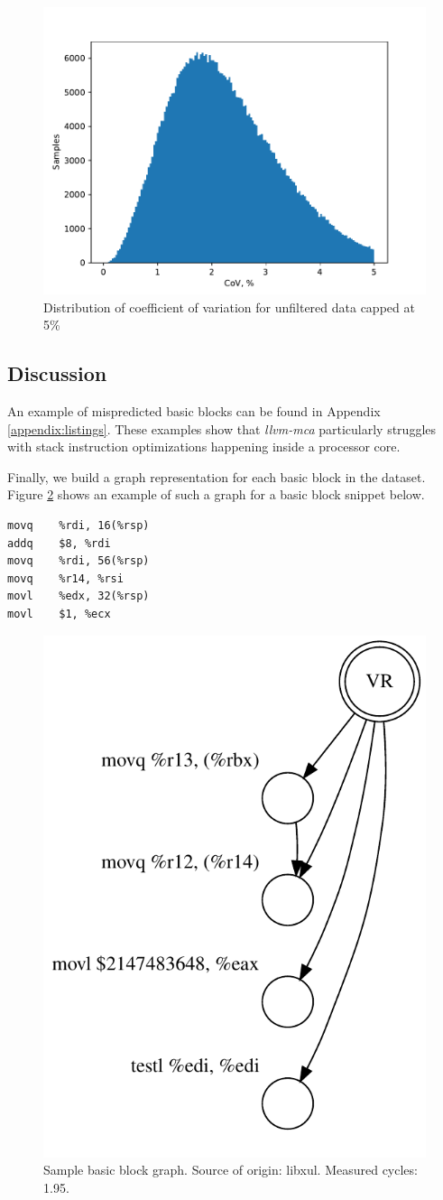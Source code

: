 \begin{figure}[h]
  \caption{Distribution of coefficient of variation for unfiltered data capped at 5\%}
  \centering
  \label{fig:cov}
  \includegraphics[width=0.9\columnwidth]{cov_distribution_zoom}
\end{figure}

\subsection{Discussion}
An example of mispredicted basic blocks can be found in Appendix \ref{appendix:listings}.
These examples show that \textit{llvm-mca} particularly struggles with stack instruction
optimizations happening inside a processor core.

Finally, we build a graph representation for each basic block in the dataset. 
Figure \ref{fig:sample_graph} shows an example of such a graph for a basic block snippet below.

\begin{lstlisting}[title={Source of the sample basic block}]
movq	%rdi, 16(%rsp)
addq	$8, %rdi
movq	%rdi, 56(%rsp)
movq	%r14, %rsi
movl	%edx, 32(%rsp)
movl	$1, %ecx
\end{lstlisting}

\begin{figure}[h]
  \caption{Sample basic block graph. Source of origin: libxul. Measured cycles: 1.95.}
  \centering
  \label{fig:sample_graph}
  \includegraphics[width=0.4\columnwidth]{sample_graph}
\end{figure}

